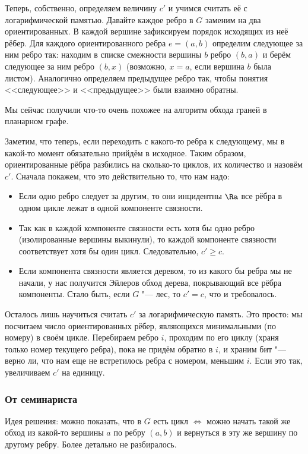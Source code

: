 		Теперь, собственно, определяем величину $c'$ и учимся считать её с логарифмической памятью.
		Давайте каждое ребро в $G$ заменим на два ориентированных.
		В каждой вершине зафиксируем порядок исходящих из неё рёбер.
		Для каждого ориентированного ребра $e=(a, b)$ определим следующее за ним ребро так:
		находим в списке смежности вершины $b$ ребро $(b, a)$ и берём следующее за ним ребро $(b, x)$
		(возможно, $x=a$, если вершина $b$ была листом).
		Аналогично определяем предыдущее ребро так, чтобы понятия <<следующее>> и <<предыдущее>>
		были взаимно обратны.
		\begin{Rem}
			Мы сейчас получили что-то очень похожее на алгоритм обхода граней в планарном графе.
		\end{Rem}
		Заметим, что теперь, если переходить с какого-то ребра к следующему, мы в какой-то
		момент обязательно прийдём в исходное.
		Таким образом, ориентированные рёбра разбились на сколько-то циклов, их количество и назовём $c'$.
		Сначала покажем, что это действительно то, что нам надо:
		\begin{itemize}
			\item
				Если одно ребро следует за другим, то они инцидентны $\Ra$
				все рёбра в одном цикле лежат в одной компоненте связности.
			\item
				Так как в каждой компоненте связности есть хотя бы одно ребро (изолированные
				вершины выкинули), то каждой компоненте связности соответствует хотя бы один цикл.
				Следовательно, $c' \ge c$.
			\item
				Если компонента связности является деревом, то из какого бы ребра мы не начали,
				у нас получится Эйлеров обход дерева, покрывающий все рёбра компоненты.
				Стало быть, если $G$ "--- лес, то $c' = c$, что и требовалось.
		\end{itemize}

		Осталось лишь научиться считать $c'$ за логарифмическую память.
		Это просто: мы посчитаем число ориентированных рёбер, являющихся минимальными (по номеру) в своём цикле.
		Перебираем ребро $i$, проходим по его циклу (храня только номер текущего ребра), пока не придём обратно в $i$,
		и храним бит "--- верно ли, что нам еще не встретилось ребра с номером, меньшим $i$.
		Если это так, увеличиваем $c'$ на единицу.

	\subsubsection{От семинариста}
		Идея решения: можно показать, что в $G$ есть цикл $\iff$
		можно начать такой же обход из какой-то вершины $a$ по ребру $(a,b)$ и вернуться в эту же вершину по другому ребру.
		Более детально не разбиралось.

